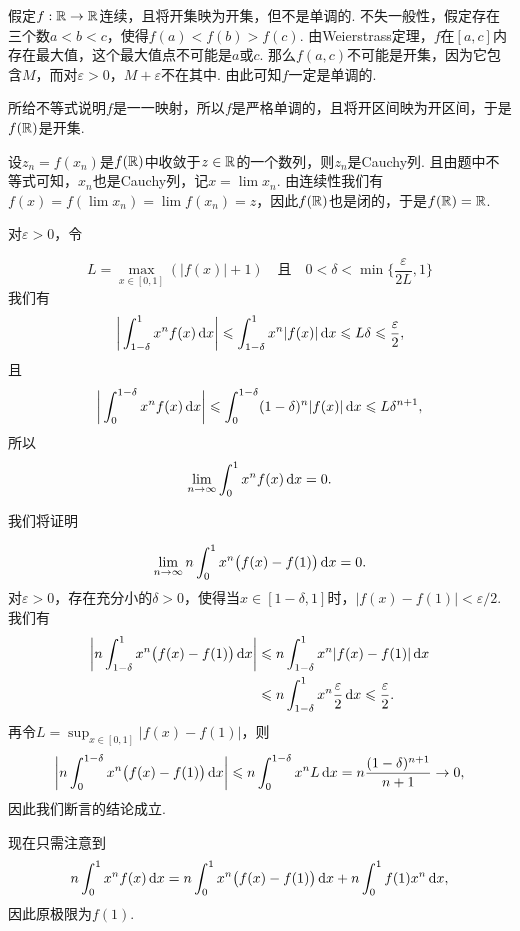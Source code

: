 \begin{ans}
  假定$f:\mathbb R\to\mathbb R$连续，且将开集映为开集，但不是单调的. 不失一般性，假定存在三个数$a<b<c$，使得$f(a)<f(b)>f(c)$. 由Weierstrass定理，$f$在$[a,c]$内存在最大值，这个最大值点不可能是$a$或$c$. 那么$f(a,c)$不可能是开集，因为它包含$M$，而对$\varepsilon>0$，$M+\varepsilon$不在其中. 由此可知$f$一定是单调的.
\end{ans}

\begin{ans}
  所给不等式说明$f$是一一映射，所以$f$是严格单调的，且将开区间映为开区间，于是$f(\mathbb R)$是开集.

  设$z_n=f(x_n)$是$f(\mathbb R)$中收敛于$z\in\mathbb R$的一个数列，则$z_n$是Cauchy列. 且由题中不等式可知，$x_n$也是Cauchy列，记$x=\lim x_n$. 由连续性我们有$f(x)=f(\lim x_n)
  =\lim f(x_n)=z$，因此$f(\mathbb R)$也是闭的，于是$f(\mathbb R)=\mathbb R$.
\end{ans}

\begin{ans}
  \begin{enumb}
    \item 对$\varepsilon>0$，令
  \end{enumb}
  \[ L=\max_{x\in[0,1]}(|f(x)|+1)\quad \text{且}\quad
    0<\delta<\min\Big\{\frac{\varepsilon}{2L},1\Big\} \]
  我们有
  \[
    \bigg| \int_{1-\delta}^1x^nf(x)\,\mathrm dx \bigg|\leqslant
    \int_{1-\delta}^1x^n|f(x)|\,\mathrm dx\leqslant L\delta\leqslant
    \frac\varepsilon2,
  \]
  且
  \[
    \bigg|\int_0^{1-\delta}x^nf(x)\,\mathrm dx\bigg|\leqslant\int_0^{1-\delta}
    (1-\delta)^n|f(x)|\,\mathrm dx \leqslant L\delta^{n+1},
  \]
  所以
  \[ \lim_{n\to\infty}\int_0^1x^nf(x)\,\dx = 0. \]
  \begin{enumb}\setcounter{enumi}{1}
    \item 我们将证明
  \end{enumb}
  \[ \lim_{n\to\infty}n\int_0^1x^n\big(f(x)-f(1)\big)\,\dx=0. \]
  对$\varepsilon>0$，存在充分小的$\delta>0$，使得当$x\in[1-\delta,1]$时，$|f(x)-f(1)|<\varepsilon/2$. 我们有
  \begin{align*}
    \bigg| n\int_{1-\delta}^1x^n\big(f(x)-f(1)\big)\,\mathrm dx \bigg| & \leqslant n\int_{1-\delta}^1x^n|f(x)-f(1)|\,\mathrm dx\\
    & \leqslant n\int_{1-\delta}^1x^n\frac{\varepsilon}2\,\mathrm dx
    \leqslant\frac\varepsilon2.
  \end{align*}
  再令$L=\sup_{x\in[0,1]}|f(x)-f(1)|$，则
  \[
    \bigg| n\int_0^{1-\delta}x^n\big(f(x)-f(1)\big)
    \,\mathrm dx \bigg|\leqslant n \int_0^{1-\delta}x^nL\,\mathrm dx
    =n\frac{(1-\delta)^{n+1}}{n+1}\to0,
  \]
  因此我们断言的结论成立.

  现在只需注意到
  \[ n\int_0^1x^nf(x)\,\mathrm dx = n\int_0^1x^n
  \big(f(x)-f(1)\big)\,\mathrm dx + n\int_0^1f(1)x^n\,\mathrm dx, \]
  因此原极限为$f(1)$.
\end{ans}

